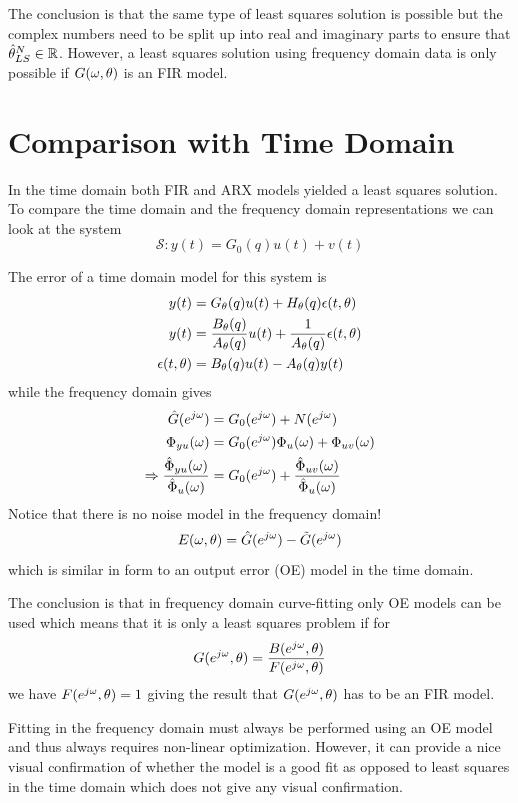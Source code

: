The conclusion is that the same type of least squares solution is possible but the complex numbers need to be split up into real and imaginary parts to ensure that $\hat{\theta}_{LS}^N\in\mathbb{R}$. However, a least squares solution using frequency domain data is only possible if $G(\omega,\theta)$ is an FIR model.

\section{Comparison with Time Domain}
In the time domain both FIR and ARX models yielded a least squares solution. To compare the time domain and the frequency domain representations we can look at the system
$$\mathcal{S}: y(t) = G_0(q)u(t) + v(t)$$

The error of a time domain model for this system is
\begin{align*}
y(t) &= G_\theta(q) u(t)+H_\theta(q)\epsilon(t,\theta) \\
y(t) &= \frac{B_\theta(q)}{A_\theta(q)}u(t) + \frac{1}{A_\theta(q)}\epsilon(t,\theta) \\
\epsilon(t,\theta) &= B_\theta(q)u(t) - A_\theta(q)y(t)
\end{align*}
while the frequency domain gives
\begin{align*}
\hat{G}(e^{j\omega}) &= G_0(e^{j\omega}) + N(e^{j\omega}) \\
\Phi_{yu}(\omega) &= G_0(e^{j\omega})\Phi_u(\omega) + \Phi_{uv}(\omega) \\
\Rightarrow \frac{\hat{\Phi}_{yu}(\omega)}{\hat{\Phi}_u(\omega)} &= G_0(e^{j\omega}) + \frac{\hat{\Phi}_{uv}(\omega)}{\hat{\Phi}_u(\omega)}
\end{align*}
Notice that there is no noise model in the frequency domain!
$$E(\omega,\theta) = \hat{G}(e^{j\omega}) - \tilde{G}(e^{j\omega})$$
which is similar in form to an output error (OE) model in the time domain.

The conclusion is that in frequency domain curve-fitting only OE models can be used which means that it is only a least squares problem if for
$$G(e^{j\omega},\theta) = \frac{B(e^{j\omega},\theta)}{F(e^{j\omega},\theta)}$$
we have $F(e^{j\omega},\theta) = 1$ giving the result that $G(e^{j\omega},\theta)$ has to be an FIR model.

Fitting in the frequency domain must always be performed using an OE model and thus always requires non-linear optimization. However, it can provide a nice visual confirmation of whether the model is a good fit as opposed to least squares in the time domain which does not give any visual confirmation.

